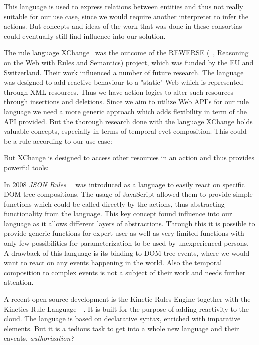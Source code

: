 This language is used to express relations between entities and thus not really suitable for our use case, since we would require another interpreter to infer the actions. But concepts and ideas of the work that was done in these consortias could eventually still find influence into our solution.

The rule language XChange~\cite{2005-Patranjan-TLE.pdf} was the outcome of the REWERSE (~\cite{wwwRewerse}, Reasoning on the Web with Rules and Semantics) project, which was funded by the EU and Switzerland. Their work influenced a number of future research. The language was designed to add reactive behaviour to a "static" Web which is represented through XML resources. Thus we have action logics to alter such resources through insertions and deletions. Since we aim to utilize Web API's for our rule language we need a more generic approach which adds flexibility in term of the API provided. But the thorough research done with the language XChange holds valuable concepts, especially in terms of temporal evet composition. This could be a rule according to our use case:


But XChange is designed to access other resources in an action and thus provides powerful tools:

In 2008 \emph{JSON Rules}~~\cite{2008-Giurca_Pascalau-JSON_Rules.pdf} was introduced as a language to easily react on specific DOM tree compositions.
The usage of JavaScript allowed them to provide simple functions which could be called directly by the actions, thus abstracting functionality from the language.
This key concept found influence into our language as it allows different layers of abstractions.
Through this it is possible to provide generic functions for expert user as well as very limited functions with only few possibilities for parameterization to be used by unexperienced persons.
A drawback of this language is its binding to DOM tree events, where we would want to react on any events happening in the world.
Also the temporal composition to complex events is not a subject of their work and needs further attention.


A recent open-source development is the Kinetic Rules Engine together with the Kinetics Rule Language~~\cite{bookTheLiveWeb}.
It is built for the purpose of adding reactivity to the cloud.
The language is based on declarative syntax, enriched with imparative elements.
But it is a tedious task to get into a whole new language and their caveats.
\emph{authorization?}

